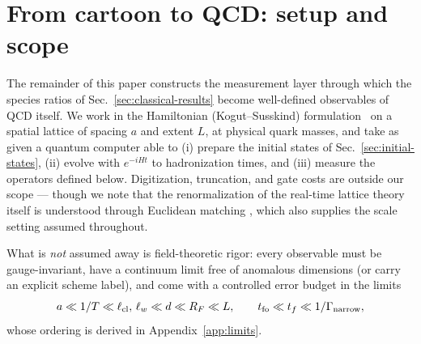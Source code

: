 \section{From cartoon to QCD: setup and scope}
\label{sec:quantum-setup}

The remainder of this paper constructs the measurement layer through which
the species ratios of Sec.~\ref{sec:classical-results} become well-defined
observables of QCD itself.  We work in the Hamiltonian (Kogut--Susskind)
formulation~\cite{Kogut:1974ag} on a spatial lattice of spacing $a$ and
extent $L$, at physical quark masses, and take as given a quantum computer
able to (i) prepare the initial states of Sec.~\ref{sec:initial-states},
(ii) evolve with $e^{-iHt}$ to hadronization times, and (iii) measure the
operators defined below.  Digitization, truncation, and gate costs are
outside our scope --- though we note that the renormalization of the
real-time lattice theory itself is understood through Euclidean matching
\cite{Carena:2021ltu}, which also supplies the scale setting assumed
throughout.

What is \emph{not} assumed away is field-theoretic rigor: every observable
must be gauge-invariant, have a continuum limit free of anomalous
dimensions (or carry an explicit scheme label), and come with a controlled
error budget in the limits
\begin{equation}
a \ll 1/T \ll \ell_{\rm cl},\,\ell_w \ll d \ll R_F \ll L,
\qquad
t_{\rm fo} \ll t_f \ll 1/\Gamma_{\rm narrow},
\label{eq:limits}
\end{equation}
whose ordering is derived in Appendix~\ref{app:limits}.
